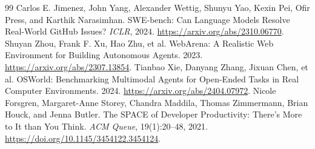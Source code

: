 \begin{thebibliography}{99}
 Carlos E. Jimenez, John Yang, Alexander Wettig, Shunyu Yao, Kexin Pei, Ofir Press, and Karthik Narasimhan. SWE-bench: Can Language Models Resolve Real-World GitHub Issues? \emph{ICLR}, 2024. \url{https://arxiv.org/abs/2310.06770}.
 Shuyan Zhou, Frank F. Xu, Hao Zhu, et al. WebArena: A Realistic Web Environment for Building Autonomous Agents. 2023. \url{https://arxiv.org/abs/2307.13854}.
 Tianbao Xie, Danyang Zhang, Jixuan Chen, et al. OSWorld: Benchmarking Multimodal Agents for Open-Ended Tasks in Real Computer Environments. 2024. \url{https://arxiv.org/abs/2404.07972}.
 Nicole Forsgren, Margaret-Anne Storey, Chandra Maddila, Thomas Zimmermann, Brian Houck, and Jenna Butler. The SPACE of Developer Productivity: There's More to It than You Think. \emph{ACM Queue}, 19(1):20--48, 2021. \url{https://doi.org/10.1145/3454122.3454124}.
\end{thebibliography}
